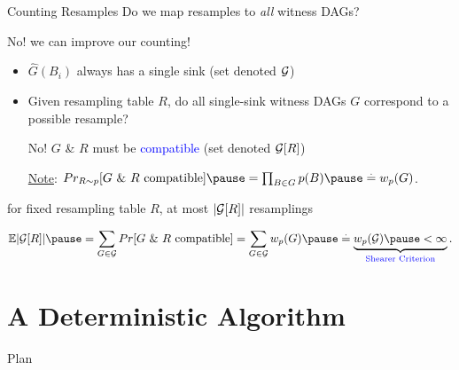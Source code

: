 \documentclass{beamer}
\def\spadding{\vspace{0.25cm}}
\def\b{\textcolor{blue}}
\newcommand*{\eqdef}{\overset{.}{=}}
\begin{document}

\begin{frame}{Counting Resamples}
Do we map resamples to \emph{all} witness DAGs?\pause\par
No! \follows we can improve our counting!\pause\spadding

\begin{itemize}
    \item $\hat{G}(B_i)$ always has a single sink (set denoted $\mathcal{G}$)\pause
    \item Given resampling table $R$, do all single-sink witness DAGs $G$ correspond to a possible resample?\pause
    
    \follows No! \pause$G$ \& $R$ must be \b{compatible} (set denoted $\mathcal{G}[R]$)\pause\spadding
    
    \underline{Note}: $\Pr[R \sim \law]{\text{$G$ \& $R$ compatible}} \pause= \prod_{B \in G} \law(B) \pause\eqdef \w(G)$.
\end{itemize}\pause\spadding

\follows for fixed resampling table $R$, at most $|\mathcal{G}[R]|$ resamplings\pause

\vspace{-1.5em}\begin{align*}
    \E{|\compat{\G}{R}|} \pause= \sum_{G \in \G} \Pr{\text{$G$ \& $R$ compatible}} = \sum_{G\in\G} \w(G) \pause\eqdef \underbrace{\w(\G) \pause < \infty}_{\text{\b{Shearer Criterion}}}.
\end{align*}
\end{frame}

\section{A Deterministic Algorithm}
\begin{frame}{Plan}
\tableofcontents[currentsection, sectionstyle=show/shaded, hideothersubsections]
\end{frame}
\end{document}
